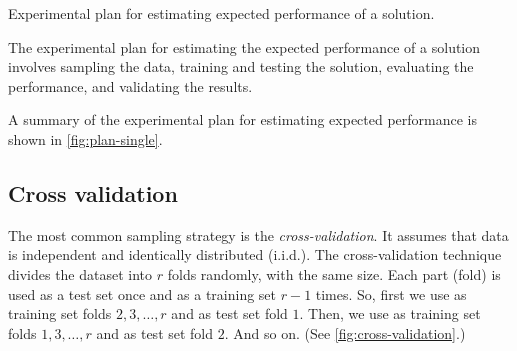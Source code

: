 \begin{figurebox}[label=fig:plan-single]{Experimental plan for estimating expected performance of a solution.}
  \tcblower
  The experimental plan for estimating the expected performance of a solution involves
  sampling the data, training and testing the solution, evaluating the performance, and
  validating the results.
\end{figurebox}

A summary of the experimental plan for estimating expected performance is shown in
\cref{fig:plan-single}.

\clearpage
\subsection{Cross validation}

The most common sampling strategy is the \emph{cross-validation}.  It assumes that data is
independent and identically distributed (i.i.d.).  The cross-validation technique divides
the dataset into $r$ folds randomly, with the same size.  Each part (fold) is used as a
test set once and as a training set $r-1$ times.  So, first we use as training set folds
$2, 3, \ldots, r$ and as test set fold $1$.  Then, we use as training set folds $1, 3,
\ldots, r$ and as test set fold $2$. And so on.  (See \cref{fig:cross-validation}.)

